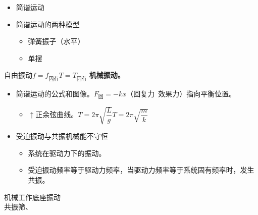 \begin{itemize}
\item 简谐运动
\item 简谐运动的两种模型
  \begin{itemize}
  \item 弹簧振子（水平）
  \item 单摆
  \end{itemize}
\end{itemize}
自由振动\quad $f=f_{\text{固有}}$\quad $T=T_{\text{固有}}$
\textbf{机械振动。}
\begin{itemize}
\item 简谐运动的公式和图像。\quad $F_{\text{回}}=-kx$（回复力\ 效果力）指向平衡位置。
  \begin{itemize}
  \item $\uparrow$正余弦曲线。\quad $T=2\pi\sqrt{\dfrac{L}{g}}$\quad $T=2\pi\sqrt{\dfrac{m}{k}}$
  \end{itemize}
\end{itemize}
\begin{itemize}
\item 受迫振动与共振\quad 机械能不守恒
  \begin{itemize}
  \item 系统在驱动力下的振动。
  \item 受迫振动频率等于驱动力频率，当驱动力频率等于系统固有频率时，发生共振。
  \end{itemize}
\end{itemize}
机械工作底座振动\\
共振筛、


